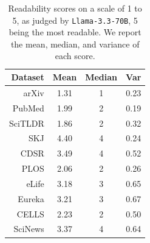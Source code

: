 \begin{table}[t]
\centering \footnotesize
\begin{tabular}{r|ccc}
Dataset & Mean & Median & Var \\ \hline
arXiv & 1.31 & 1 & 0.23 \\
PubMed & 1.99 & 2 & 0.19 \\
SciTLDR & 1.86 & 2 & 0.32 \\
SKJ & 4.40 & 4 & 0.24 \\ 
CDSR & 3.49 & 4 & 0.52 \\
PLOS & 2.06 & 2 & 0.26 \\
eLife & 3.18 & 3 & 0.65 \\
Eureka & 3.21 & 3 & 0.67 \\
CELLS & 2.23 & 2 & 0.50 \\
SciNews & 3.37 & 4 & 0.64
\end{tabular}
\vspace{-2mm}
\caption{Readability scores on a scale of 1 to 5, as judged by \texttt{Llama-3.3-70B}, 5 being the most readable. We report the mean, median, and variance of each score.}\label{tab:lm-readability-scores-by-dataset}
\vspace{-4mm}
\end{table}